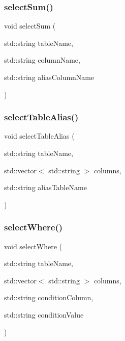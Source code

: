 \mbox{\label{sqllib_8hpp_a9f37b58ba921dc5e6b5d4a5d0fefe28e}} 
\subsubsection{select\+Sum()}
{\footnotesize\ttfamily void select\+Sum (\begin{DoxyParamCaption}\item[{std\+::string}]{table\+Name,  }\item[{std\+::string}]{column\+Name,  }\item[{std\+::string}]{alias\+Column\+Name }\end{DoxyParamCaption})}

\mbox{\label{sqllib_8hpp_a3ac5ebbcfb624dc5178315c85c4b15fa}} 
\subsubsection{select\+Table\+Alias()}
{\footnotesize\ttfamily void select\+Table\+Alias (\begin{DoxyParamCaption}\item[{std\+::string}]{table\+Name,  }\item[{std\+::vector$<$ std\+::string $>$}]{columns,  }\item[{std\+::string}]{alias\+Table\+Name }\end{DoxyParamCaption})}

\mbox{\label{sqllib_8hpp_a90eb635de3f1856a45557b42f18eff28}} 
\subsubsection{select\+Where()}
{\footnotesize\ttfamily void select\+Where (\begin{DoxyParamCaption}\item[{std\+::string}]{table\+Name,  }\item[{std\+::vector$<$ std\+::string $>$}]{columns,  }\item[{std\+::string}]{condition\+Column,  }\item[{std\+::string}]{condition\+Value }\end{DoxyParamCaption})}

